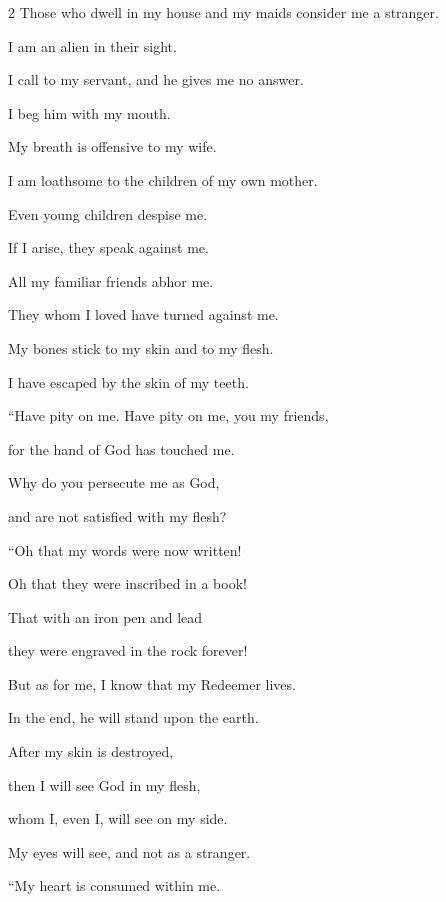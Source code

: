 \begin{multicols}{2}
	\myverse{}Those who dwell in my house and my maids consider me a stranger.
	
	I am an alien in their sight.
	
	\myverse{}I call to my servant, and he gives me no answer.
	
	I beg him with my mouth.
	
	\myverse{}My breath is offensive to my wife.
	
	I am loathsome to the children of my own mother.
	
	\myverse{}Even young children despise me.
	
	If I arise, they speak against me.
	
	\myverse{}All my familiar friends abhor me.
	
	They whom I loved have turned against me.
	
	\myverse{}My bones stick to my skin and to my flesh.
	
	I have escaped by the skin of my teeth.
	
	\vspace{\baselineskip}
	
	\myverse{}“Have pity on me. Have pity on me, you my friends,
	
	for the hand of God has touched me.
	
	\myverse{}Why do you persecute me as God,
	
	and are not satisfied with my flesh?
	
	\vspace{\baselineskip}
	
	\myverse{}“Oh that my words were now written!
	
	Oh that they were inscribed in a book!
	
	\myverse{}That with an iron pen and lead
	
	they were engraved in the rock forever!
	
	\myverse{}But as for me, I know that my Redeemer lives.
	
	In the end, he will stand upon the earth.
	
	\myverse{}After my skin is destroyed,
	
	then I will see God in my flesh,
	
	\myverse{}whom I, even I, will see on my side.
	
	My eyes will see, and not as a stranger.
	
	\vspace{\baselineskip}
	
	“My heart is consumed within me.
	

\end{multicols}
